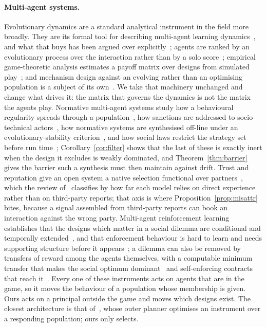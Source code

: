 \documentclass[pdflatex]{sn-jnl}
\theoremstyle{thmstyleone}
\theoremstyle{thmstylethree}
\theoremstyle{thmstyletwo}
\begin{document}
\paragraph{Multi-agent systems.}
Evolutionary dynamics are a standard analytical instrument in the field more
broadly. They are its formal tool for describing multi-agent learning
dynamics~\citep{bloembergen2015evolutionary}, and what that buys has been
argued over explicitly~\citep{tuyls2007what}; agents are ranked by an
evolutionary process over the interaction rather than by a solo
score~\citep{omidshafiei2019alpharank}; empirical game-theoretic analysis
estimates a payoff matrix over designs from simulated
play~\citep{tuyls2020bounds}; and mechanism design against an evolving rather
than an optimising population is a subject of its
own~\citep{phelps2010evolutionary}. We take that machinery unchanged and
change what drives it: the matrix that governs the dynamics is not the matrix
the agents play. Normative multi-agent systems study how a behavioural
regularity spreads through a population~\citep{morrismartin2019norm}, how
sanctions are addressed to socio-technical actors~\citep{nardin2016sanctions},
how normative systems are synthesised off-line under an evolutionary-stability
criterion~\citep{morales2018offline}, and how social laws restrict the strategy
set before run time~\citep{shoham1995social}; Corollary~\ref{cor:filter} shows
that the last of these is exactly inert when the design it excludes is weakly
dominated, and Theorem~\ref{thm:barrier} gives the barrier such a synthesis
must then maintain against drift. Trust and reputation give an open system a
native selection functional over partners~\citep{huynh2006integrated}, which
the review of~\citet{pinyol2013computational} classifies by how far each model
relies on direct experience rather than on third-party reports; that axis is
where Proposition~\ref{prop:misattr} bites, because a signal assembled from
third-party reports can book an interaction against the wrong party.
Multi-agent reinforcement learning establishes that the designs which matter
in a social dilemma are conditional and temporally
extended~\citep{leibo2017sequential}, and that enforcement behaviour is hard
to learn and needs supporting structure before it
appears~\citep{koster2022spurious}; a dilemma can also be removed by transfers
of reward among the agents themselves, with a computable minimum transfer that
makes the social optimum dominant~\citep{willis2024minimal} and self-enforcing
contracts that reach it~\citep{haupt2024contracts}. Every one of these
instruments acts on agents that are in the game, so it moves the behaviour of
a population whose membership is given. Ours acts on a principal outside the
game and moves which designs exist. The closest architecture is that
of~\citet{zheng2022aieconomist}, whose outer planner optimises an instrument
over a responding population; ours only selects.
\end{document}
